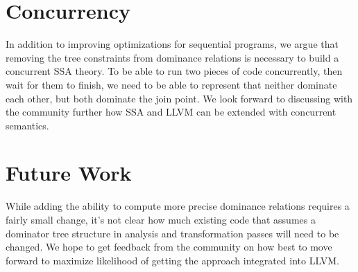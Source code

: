 \documentclass[a4paper,twocolumn]{article}
\begin{document}
\section*{Concurrency}
In addition to improving optimizations for sequential programs, we argue that 
removing the tree constraints from dominance relations is necessary to build a
concurrent SSA theory. To be able to run two pieces of code concurrently, then
wait for them to finish, we need to be able to represent that neither dominate
each other, but both dominate the join point. We look forward to discussing
with the community further how SSA and LLVM can be extended with concurrent
semantics.

\section*{Future Work}
While adding the ability to compute more precise dominance relations requires
a fairly small change, it's not clear how much existing code that assumes a 
dominator tree structure in analysis and transformation passes will need to be
changed. We hope to get feedback from the community on how best to move forward
to maximize likelihood of getting the approach integrated into LLVM. 


\end{document}
